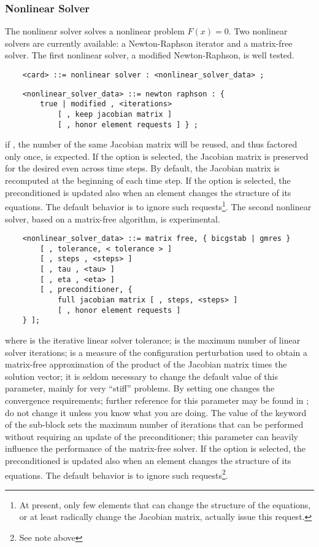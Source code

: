 \subsubsection{Nonlinear Solver}
The nonlinear solver solves a nonlinear problem $F(x)=0$.
Two nonlinear solvers are currently available:
a Newton-Raphson iterator and a matrix-free solver.
The first nonlinear solver, a modified Newton-Raphson, 
is well tested.
\begin{verbatim}
    <card> ::= nonlinear solver : <nonlinear_solver_data> ;
\end{verbatim}
\begin{verbatim}
    <nonlinear_solver_data> ::= newton raphson : { 
        true | modified , <iterations>
            [ , keep jacobian matrix ]
            [ , honor element requests ] } ;
\end{verbatim}
if , the number of  the same Jacobian matrix 
will be reused, and thus factored only once, is expected.
If the option  is selected,
the Jacobian matrix is preserved
for the desired  even across time steps.
By default, the Jacobian matrix is recomputed at the beginning 
of each time step.
If the option  is selected, the preconditioned
is updated also when an element changes the structure of its equations.
The default behavior is to ignore such requests\footnote{
	At present, only few elements that can change the structure
	of the equations, or at least radically change the Jacobian matrix,
	actually issue this request.
}.
The second nonlinear solver, based on a
matrix-free algorithm, is experimental.
\begin{verbatim}
    <nonlinear_solver_data> ::= matrix free, { bicgstab | gmres }
        [ , tolerance, < tolerance > ]
        [ , steps , <steps> ]
        [ , tau , <tau> ]
        [ , eta , <eta> ]
        [ , preconditioner, {
            full jacobian matrix [ , steps, <steps> ] 
	        [ , honor element requests ]
    } ];
\end{verbatim}
where  is the iterative linear solver tolerance;
 is the maximum number of linear solver iterations;
 is a measure of the configuration perturbation used
to obtain a matrix-free approximation of the product
of the Jacobian matrix times the solution vector;
it is seldom necessary to change the default value of this parameter,
mainly for very ``stiff'' problems.
By setting  one changes the convergence requirements; 
further reference for this parameter may be found in \cite{KELLEY-1995}; 
do not change it unless you know what you are doing.
The value  of the  keyword 
of the  sub-block 
sets the maximum number of iterations that can be performed 
without requiring an update of the preconditioner; 
this parameter can heavily influence
the performance of the matrix-free solver.
If the option  is selected, the preconditioned
is updated also when an element changes the structure of its equations.
The default behavior is to ignore such requests\footnote{See note above}.



